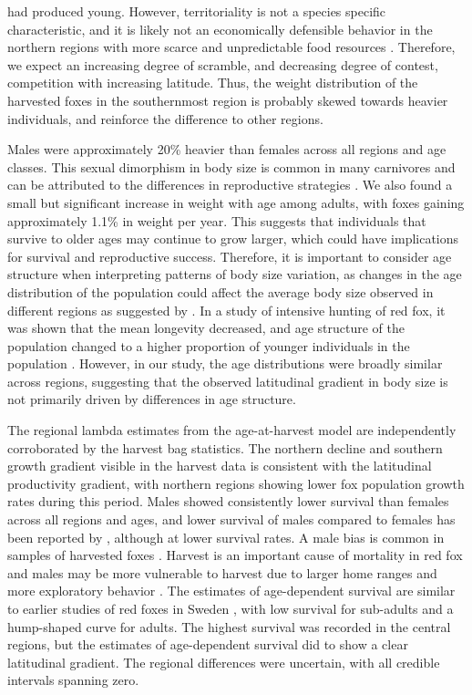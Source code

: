 \documentclass[12pt,a4paper,final,abstract=true,headings=small]{scrartcl}
\begin{document}
had produced young. However, territoriality is not a species specific characteristic, and it is likely not an economically defensible behavior in the northern regions with more scarce and unpredictable food resources \citep{powell2000animal}. Therefore, we expect an increasing degree of scramble, and decreasing degree of contest, competition with increasing latitude.
 Thus, the weight distribution of the harvested foxes in the southernmost region is probably skewed towards heavier individuals, and reinforce the difference to other regions.

Males were approximately 20\% heavier than females across all regions and age classes. This sexual dimorphism in body size is common in many carnivores and can be attributed to the differences in reproductive strategies \citep{gittlemanCarnivoreBodySize1985, moorsSexualDimorphismBody1980}. We also found a small but significant increase in weight with age among adults, with foxes gaining approximately 1.1\% in weight per year. This suggests that individuals that survive to older ages may continue to grow larger, which could have implications for survival and reproductive success. Therefore, it is important to consider age structure when interpreting patterns of body size variation, as changes in the age distribution of the population could affect the average body size observed in different regions as suggested by \citet{theriotAccountingAgeUncovering2024a}. In a study of intensive hunting of red fox, it was shown that the mean longevity decreased, and age structure of the population changed to a higher proportion of younger individuals in the population \citep{yonedaEffectsHuntingAge1982}. However, in our study, the age distributions were broadly similar across regions, suggesting that the observed latitudinal gradient in body size is not primarily driven by differences in age structure.

The regional lambda estimates from the age-at-harvest model are independently corroborated by the harvest bag statistics. The northern decline and southern growth gradient visible in the harvest data is consistent with the latitudinal productivity gradient, with northern regions showing lower fox population growth rates during this period. Males showed consistently lower survival than females across all regions and ages, and lower survival of males compared to females has been reported by \citet{heydonDemographyRuralFoxes2000}, although at lower survival rates. A male bias is common in samples of harvested foxes \citep{englundAspectsReproductionMortality1970,yonedaEffectsHuntingAge1982}. Harvest is an important cause of mortality in red fox and males may be more vulnerable to harvest due to larger home ranges and more exploratory behavior \citep{heydonDemographyRuralFoxes2000}. The estimates of age-dependent survival are similar to earlier studies of red foxes in Sweden \citep{devenish-nelsonDemographyCarnivoreRed2013, willebrandDecliningSurvivalRates2022}, with low survival for sub-adults and a hump-shaped curve for adults. The highest survival was recorded in the central regions, but the estimates of age-dependent survival did to show a clear latitudinal gradient. The regional differences were uncertain, with all credible intervals spanning zero.
\end{document}
